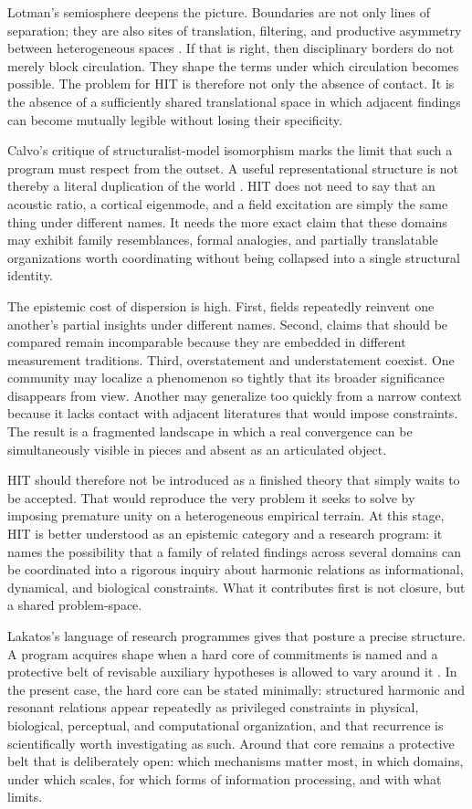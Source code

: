 Lotman's semiosphere deepens the picture. Boundaries are not only lines of separation; they are also sites of translation, filtering, and productive asymmetry between heterogeneous spaces \parencite{lotman_2005}. If that is right, then disciplinary borders do not merely block circulation. They shape the terms under which circulation becomes possible. The problem for HIT is therefore not only the absence of contact. It is the absence of a sufficiently shared translational space in which adjacent findings can become mutually legible without losing their specificity.

Calvo's critique of structuralist-model isomorphism marks the limit that such a program must respect from the outset. A useful representational structure is not thereby a literal duplication of the world \parencite{calvo_2006}. HIT does not need to say that an acoustic ratio, a cortical eigenmode, and a field excitation are simply the same thing under different names. It needs the more exact claim that these domains may exhibit family resemblances, formal analogies, and partially translatable organizations worth coordinating without being collapsed into a single structural identity.

The epistemic cost of dispersion is high. First, fields repeatedly reinvent one another's partial insights under different names. Second, claims that should be compared remain incomparable because they are embedded in different measurement traditions. Third, overstatement and understatement coexist. One community may localize a phenomenon so tightly that its broader significance disappears from view. Another may generalize too quickly from a narrow context because it lacks contact with adjacent literatures that would impose constraints. The result is a fragmented landscape in which a real convergence can be simultaneously visible in pieces and absent as an articulated object.

HIT should therefore not be introduced as a finished theory that simply waits to be accepted. That would reproduce the very problem it seeks to solve by imposing premature unity on a heterogeneous empirical terrain. At this stage, HIT is better understood as an epistemic category and a research program: it names the possibility that a family of related findings across several domains can be coordinated into a rigorous inquiry about harmonic relations as informational, dynamical, and biological constraints. What it contributes first is not closure, but a shared problem-space.

Lakatos's language of research programmes gives that posture a precise structure. A program acquires shape when a hard core of commitments is named and a protective belt of revisable auxiliary hypotheses is allowed to vary around it \parencite{lakatos_1978}. In the present case, the hard core can be stated minimally: structured harmonic and resonant relations appear repeatedly as privileged constraints in physical, biological, perceptual, and computational organization, and that recurrence is scientifically worth investigating as such. Around that core remains a protective belt that is deliberately open: which mechanisms matter most, in which domains, under which scales, for which forms of information processing, and with what limits.


